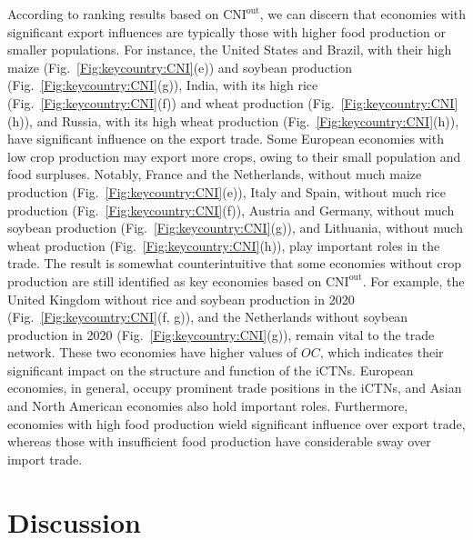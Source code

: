 \documentclass[preprint,3p,times,sort&compress]{elsarticle}
\begin{document}
 According to ranking results based on $\mathrm{CNI}^{\mathrm{out}}$, we can discern that economies with significant export influences are typically those with higher food production or smaller populations. For instance, the United States and Brazil, with their high maize (Fig.~\ref{Fig:keycountry:CNI}(e)) and soybean production (Fig.~\ref{Fig:keycountry:CNI}(g)), India, with its high rice (Fig.~\ref{Fig:keycountry:CNI}(f)) and wheat production (Fig.~\ref{Fig:keycountry:CNI}(h)), and Russia, with its high wheat production (Fig.~\ref{Fig:keycountry:CNI}(h)), have significant influence on the export trade. Some European economies with low crop production may export more crops, owing to their small population and food surpluses. Notably, France and the Netherlands, without much maize production (Fig.~\ref{Fig:keycountry:CNI}(e)), Italy and Spain, without much rice production (Fig.~\ref{Fig:keycountry:CNI}(f)), Austria and Germany, without much soybean production (Fig.~\ref{Fig:keycountry:CNI}(g)), and Lithuania, without much wheat production (Fig.~\ref{Fig:keycountry:CNI}(h)), play important roles in the trade. The result is somewhat counterintuitive that some economies without crop production are still identified as key economies based on $\mathrm{CNI}^{\mathrm{out}}$. For example, the United Kingdom without rice and soybean production in 2020 (Fig.~\ref{Fig:keycountry:CNI}(f, g)), and the Netherlands without soybean production in 2020 (Fig.~\ref{Fig:keycountry:CNI}(g)), remain vital to the trade network. These two economies have higher values of $OC$, which indicates their significant impact on the structure and function of the iCTNs. European economies, in general, occupy prominent trade positions in the iCTNs, and Asian and North American economies also hold important roles. Furthermore, economies with high food production wield significant influence over export trade, whereas those with insufficient food production have considerable sway over import trade.




\section{Discussion}
\label{S4:Discussion}
\end{document}

